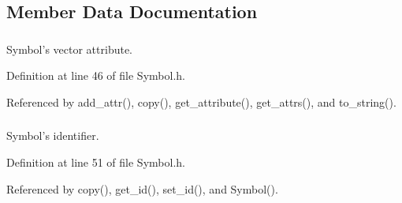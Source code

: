 \subsection{Member Data Documentation}
\hypertarget{classgenevalmag_1_1Symbol_a5085d920f7836a0b44993cc0e167e4c7}{
\subsubsection[{symb\_\-attrs}]{}}
\label{classgenevalmag_1_1Symbol_a5085d920f7836a0b44993cc0e167e4c7}


Symbol's vector attribute. 



Definition at line 46 of file Symbol.h.



Referenced by add\_\-attr(), copy(), get\_\-attribute(), get\_\-attrs(), and to\_\-string().

\hypertarget{classgenevalmag_1_1Symbol_aea1a4b2cd5d6ddd60a0f4c68989c11bd}{
\subsubsection[{symb\_\-id}]{}}
\label{classgenevalmag_1_1Symbol_aea1a4b2cd5d6ddd60a0f4c68989c11bd}


Symbol's identifier. 



Definition at line 51 of file Symbol.h.



Referenced by copy(), get\_\-id(), set\_\-id(), and Symbol().

\hypertarget{classgenevalmag_1_1Symbol_a72161dc9f286b5b4e18c4f849de52ebd}{
\subsubsection[{symb\_\-name}]{}}
\label{classgenevalmag_1_1Symbol_a72161dc9f286b5b4e18c4f849de52ebd}


